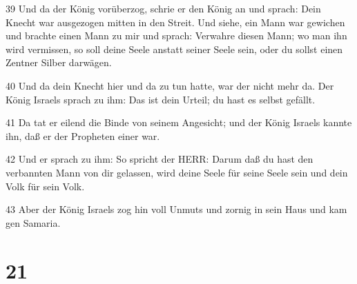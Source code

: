 \par 39 Und da der König vorüberzog, schrie er den König an und sprach: Dein Knecht war ausgezogen mitten in den Streit. Und siehe, ein Mann war gewichen und brachte einen Mann zu mir und sprach: Verwahre diesen Mann; wo man ihn wird vermissen, so soll deine Seele anstatt seiner Seele sein, oder du sollst einen Zentner Silber darwägen.
\par 40 Und da dein Knecht hier und da zu tun hatte, war der nicht mehr da. Der König Israels sprach zu ihm: Das ist dein Urteil; du hast es selbst gefällt.
\par 41 Da tat er eilend die Binde von seinem Angesicht; und der König Israels kannte ihn, daß er der Propheten einer war.
\par 42 Und er sprach zu ihm: So spricht der HERR: Darum daß du hast den verbannten Mann von dir gelassen, wird deine Seele für seine Seele sein und dein Volk für sein Volk.
\par 43 Aber der König Israels zog hin voll Unmuts und zornig in sein Haus und kam gen Samaria.

\chapter{21}

